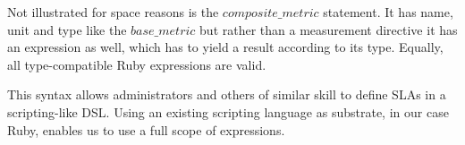 Not illustrated for space reasons is the $composite\_metric$ statement. It has name, unit and type like the $base\_metric$ but rather than a measurement directive it has an expression as well, which has to yield a result according to its type. Equally, all type-compatible Ruby expressions are valid.

This syntax allows administrators and others of similar skill to define SLAs in a scripting-like DSL. Using an existing scripting language as substrate, in our case Ruby, enables us to use a full scope of expressions.


%
%
%
% 
